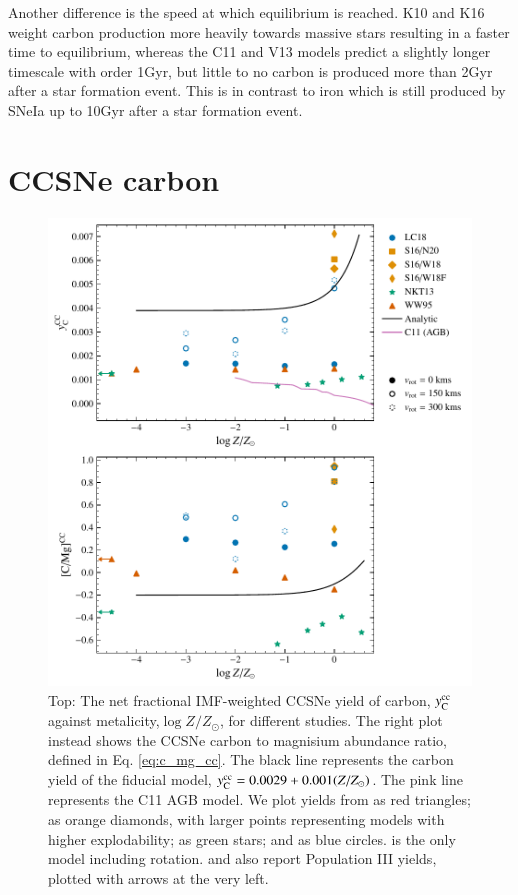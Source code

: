 \documentclass[12pt,oneside]{report}
\newcommand{\Ycc}{\ensuremath{y_{\rm C}^{\rm cc}}}
\begin{document}
Another difference is the speed at which equilibrium is reached. K10 and K16 weight carbon production more heavily towards massive stars resulting in a faster time to equilibrium, whereas the C11 and V13 models predict a slightly longer timescale with order 1Gyr, but little to no carbon is produced more than 2Gyr after a star formation event. This is in contrast to iron which is still produced by SNeIa up to 10Gyr after a star formation event. 


\section{CCSNe carbon}

\begin{figure}[htp]
    \centering
    \includegraphics{y_c_cc.pdf}
    \caption[CCSNe carbon yields]{Top: The net fractional IMF-weighted CCSNe yield of
        carbon, $\Ycc$ against metalicity,$\log Z/Z_\odot$, for different studies.
        The right plot instead shows the CCSNe carbon to magnisium abundance ratio, defined in Eq. \ref{eq:c_mg_cc}. The black line represents the carbon yield of the fiducial model,
    $\Ycc = 0.0029 + 0.001 (Z/Z_{\odot})$. The pink line represents the C11 AGB model.    We plot yields from \citet{WW95} as red triangles; \citep{sukhbold+16} as orange diamonds, with larger points representing models with higher explodability; \citet{NKT13} as green stars; and \citep{LC18} as blue circles. \citet{LC18} is the only model including rotation. \citet{NKT13} and \citet{WW95} also report Population III yields, plotted with arrows at the very left.}
    \label{fig:y_cc}
\end{figure}
\end{document}
